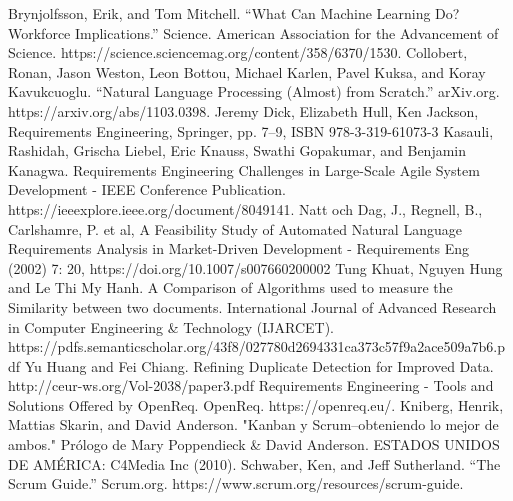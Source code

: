 \documentclass[11pt]{article}
\begin{document}
\begin{thebibliography}{99}

 Brynjolfsson, Erik, and Tom Mitchell. “What Can Machine Learning Do? Workforce Implications.” Science. American Association for the Advancement of Science. https://science.sciencemag.org/content/358/6370/1530.
 Collobert, Ronan, Jason Weston, Leon Bottou, Michael Karlen, Pavel Kuksa, and Koray Kavukcuoglu. “Natural Language Processing (Almost) from Scratch.” arXiv.org. https://arxiv.org/abs/1103.0398.
 Jeremy Dick, Elizabeth Hull, Ken Jackson, Requirements Engineering, Springer, pp. 7–9, ISBN 978-3-319-61073-3
 Kasauli, Rashidah, Grischa Liebel, Eric Knauss, Swathi Gopakumar, and Benjamin Kanagwa. Requirements Engineering Challenges in Large-Scale Agile System Development - IEEE Conference Publication. https://ieeexplore.ieee.org/document/8049141.
 Natt och Dag, J., Regnell, B., Carlshamre, P. et al, A Feasibility Study of Automated Natural Language Requirements Analysis in Market-Driven Development -  Requirements Eng (2002) 7: 20, https://doi.org/10.1007/s007660200002
 Tung Khuat, Nguyen Hung and Le Thi My Hanh. A Comparison of Algorithms used to measure the Similarity between two documents. International Journal of Advanced Research in Computer Engineering \& Technology (IJARCET). https://pdfs.semanticscholar.org/43f8/027780d2694331ca373c57f9a2ace509a7b6.pdf
 Yu Huang and Fei Chiang. Refining Duplicate Detection for Improved Data. http://ceur-ws.org/Vol-2038/paper3.pdf
 Requirements Engineering - Tools and Solutions Offered by OpenReq. OpenReq. https://openreq.eu/.
 Kniberg, Henrik, Mattias Skarin, and David Anderson. "Kanban y Scrum–obteniendo lo mejor de ambos." Prólogo de Mary Poppendieck \& David Anderson. ESTADOS UNIDOS DE AMÉRICA: C4Media Inc (2010).
 Schwaber, Ken, and Jeff Sutherland. “The Scrum Guide.” Scrum.org. https://www.scrum.org/resources/scrum-guide.

\end{thebibliography}
\end{document}
